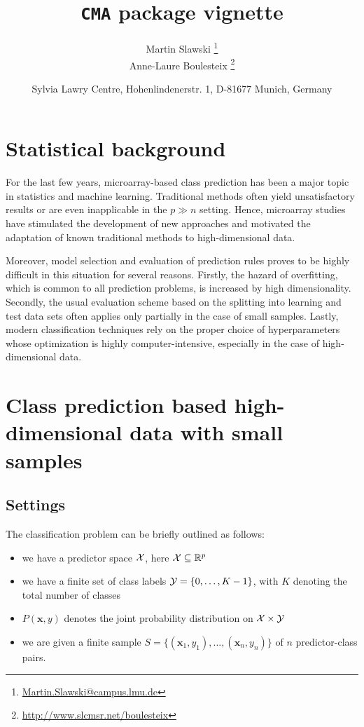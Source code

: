 

\title{\large{\texttt{CMA}} package vignette}
\author{Martin Slawski \footnote{\url{Martin.Slawski@campus.lmu.de}}\\
        Anne-Laure Boulesteix \footnote{\url{http://www.slcmsr.net/boulesteix}}}

\usepackage{/home/mcarlson/arch/x86_64/R-2-7/share/texmf/Sweave}

\date{\normalsize{Sylvia Lawry Centre, Hohenlindenerstr. 1, D-81677 Munich, Germany}}
\maketitle


\section{Statistical background}
\label{sec:0}
For the last few years, microarray-based class prediction has been a major
topic in statistics and machine learning. 
Traditional methods often yield unsatisfactory results or are 
even inapplicable in the $p \gg n$ setting.
Hence, microarray studies have stimulated the development of 
new approaches and motivated the adaptation of known traditional methods
to high-dimensional data.
 
Moreover, model selection and evaluation of prediction rules 
proves to be highly difficult in this situation for several reasons.
Firstly, the hazard of overfitting, which is common to all prediction problems,
is increased by high dimensionality. Secondly, the usual evaluation scheme based
on the splitting  into learning and test data sets often applies only partially in
the case of small samples.
Lastly, modern classification techniques rely on the proper choice of hyperparameters 
whose optimization is highly computer-intensive, especially in the case of
high-dimensional data.


\section{Class prediction based high-dimensional data with small samples}\label{sec:1}
\subsection{Settings}
The classification problem can be briefly outlined as follows:
\begin{itemize}
\item we have a predictor space $\mathcal X$, here $\mathcal X \subseteq {\mathbb R}^p$
\item we have a finite set of class labels $\mathcal Y = \{0,\ldots,K-1\}$,
      with $K$ denoting the total number of classes
\item $P(\bm{x},y)$ denotes the joint probability distribution on $\mathcal X \times \mathcal Y$
\item we are given a finite sample $S = \{(\bm{x}_1,y_1),\ldots,(\bm{x}_n,y_n) \}$
      of $n$ predictor-class pairs.
\end{itemize}

